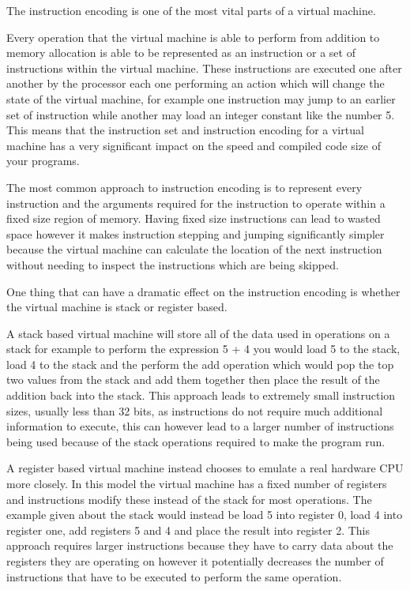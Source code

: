 \documentclass[]{final_report}
\begin{document}
The instruction encoding is one of the most vital parts of a virtual machine.

Every operation that the virtual machine is able to perform from addition to memory allocation is able to be represented as an instruction or a set of instructions within the virtual machine.
These instructions are executed one after another by the processor each one performing an action which will change the state of the virtual machine, for example one instruction may jump to an earlier set of instruction while another may load an integer constant like the number 5.
This means that the instruction set and instruction encoding for a virtual machine has a very significant impact on the speed and compiled code size of your programs.

The most common approach to instruction encoding is to represent every instruction and the arguments required for the instruction to operate within a fixed size region of memory. Having fixed size instructions can lead to wasted space however it makes instruction stepping and jumping significantly simpler because the virtual machine can calculate the location of the next instruction without needing to inspect the instructions which are being skipped.

One thing that can have a dramatic effect on the instruction encoding is whether the virtual machine is stack or register based.

A stack based virtual machine will store all of the  data used in operations on a stack for example to perform the expression 5 + 4 you would load 5 to the stack, load 4 to the stack and the perform the add operation which would pop the top two values from the stack and add them together then place the result of the addition back into the stack. This approach leads to extremely small instruction sizes, usually less than 32 bits, as instructions do not require much additional information to execute, this can however lead to a larger number of instructions being used because of the stack operations required to make the program run.

A register based virtual machine instead chooses to emulate a real hardware CPU more closely. In this model the virtual machine has a fixed number of registers and instructions modify these instead of the stack for most operations. The example given about the stack would instead be load 5 into register 0, load 4 into register one, add registers 5 and 4 and place the result into register 2. This approach requires larger instructions because they have to carry data about the registers they are operating on however it potentially decreases the number of instructions that have to be executed to perform the same operation. 
\end{document}
